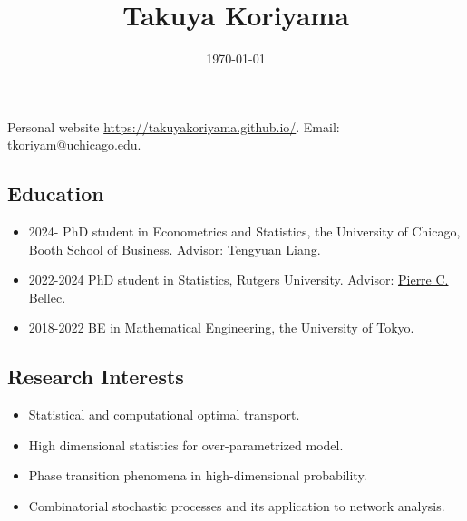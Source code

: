 \documentclass[10pt]{amsart}
\date{\today}
\title{Takuya Koriyama}
\begin{document}
\maketitle
\begin{center}
  Personal website \url{https://takuyakoriyama.github.io/}.
Email: tkoriyam@uchicago.edu.
\end{center}
\subsection*{Education}
\begin{itemize}
  \item 2024- PhD student in Econometrics and Statistics, the University of Chicago, Booth School of Business. Advisor: \href{https://tyliang.github.io}{Tengyuan Liang}. 
  \item 2022-2024 PhD student in Statistics, Rutgers University. Advisor: \href{https://statweb.rutgers.edu/PCB71/}{Pierre C. Bellec}. 
  \item 2018-2022 BE in Mathematical Engineering, the University of Tokyo. 
\end{itemize}

\subsection*{Research Interests}
\noindent
\begin{itemize}
  \item Statistical and computational optimal transport. 
  \item High dimensional statistics for over-parametrized model. 
  \item Phase transition phenomena in high-dimensional probability.
  \item Combinatorial stochastic processes and its application to network analysis. 
\end{itemize}
\end{document}
